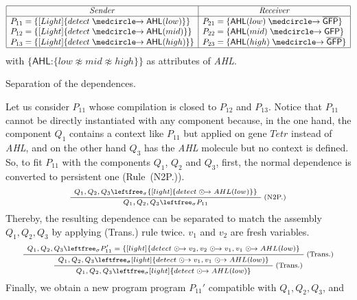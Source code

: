 \documentclass{eptcs}
\newcounter{ti}
\begin{document}
\begin{table}[t]
\scriptsize
\centering
$$
\begin{array}{|l @{\; = \; } l | l @{\; = \; } l|} 
\hline
\multicolumn{2}{|c|}{\mathit{Sender}} & \multicolumn{2}{c|}{\mathit{Receiver}} \\
\hline 
P_{11} & \{\context{Light}\{detect\cause\textsf{AHL}(low)\}\} & P_{21} & \{\textsf{AHL}(low)\cause \overline{\textsf{GFP}}\} \\
P_{12} & \{\context{Light}\{detect\cause\textsf{AHL}(mid)\}\} & P_{22} & \{\textsf{AHL}(mid)\cause \textsf{GFP}\}\\
P_{13} & \{\context{Light}\{detect\cause\textsf{AHL}(high)\}\}& P_{23} & \{\textsf{AHL}(high)\cause \overline{\textsf{GFP}}\}\\
\hline
\end{array}
$$
with $\{\textsf{AHL:}\{low \napprox mid \napprox high \}\}$ as attributes of \textit{AHL}.
\caption{Separation of the dependences.}
\label{tab:reecCode}
\end{table}
Let us consider $P_{11}$ whose compilation is closed to $P_{12}$ and $P_{13}$. Notice that $P_{11}$ cannot be directly instantiated with any component because, in the one hand, the component $Q_1$ contains a context like $P_{11}$ but applied on gene $\mathit{Tetr}$ instead of \textit{AHL}, and on the other hand $Q_3$ has the \textit{AHL} molecule but no context is defined. So, to fit $P_{11}$ with the components $Q_1$, $Q_2$ and $Q_3$, first, the normal dependence is converted to persistent one (Rule~(N2P.)).
\begin{equation*}
\scriptsize
\AxiomC{$Q_1,Q_2,Q_3\leftfree_{\sigma} \{\context{light}\{detect\pcause AHL(low)\} \}$}
\RightLabel{(N2P.)}
\UnaryInfC{$Q_1,Q_2,Q_3\leftfree_{\sigma} P_{11}$}
\DisplayProof
\end{equation*}
Thereby, the resulting dependence can be separated to match the assembly $Q_1, Q_2, Q_3$ by applying (Trans.) rule twice. $v_1$ and $v_2$ are fresh variables.
\begin{equation*}
\scriptsize
\AxiomC{$Q_1,Q_2,Q_3\leftfree_{\sigma} P_{11}'= \{\context{light}\{detect\pcause v_2, v_2\pcause v_1, v_1\pcause AHL(low)\}$}
\RightLabel{(Trans.)}
\UnaryInfC{$Q_1,Q_2,Q_3\leftfree_{\sigma} \context{light}\{detect\pcause v_1, v_1\pcause AHL(low)\}$}
\RightLabel{(Trans.)}
\UnaryInfC{$Q_1,Q_2,Q_3\leftfree_{\sigma} \context{light}\{detect\pcause AHL(low)\}$}
\DisplayProof
\end{equation*}
Finally, we obtain a new program program $P_{11}'$ compatible with $Q_1,Q_2,Q_3$, and
\end{document}
